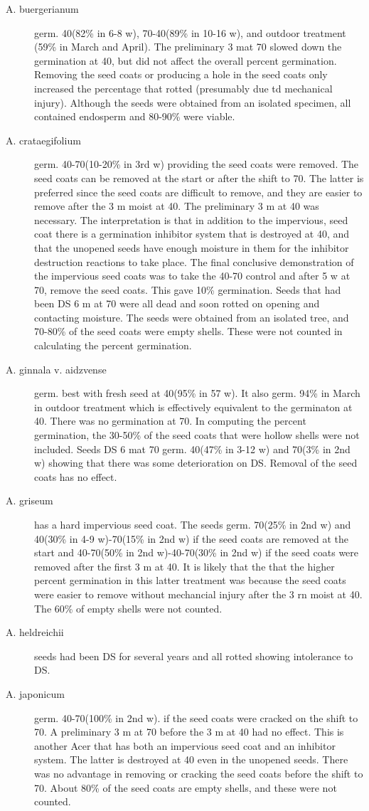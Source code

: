 \begin{description}
\item[A. buergerianum] germ. 40(82\% in 6-8 w), 70-40(89\% in 10-16 w), and outdoor
treatment (59\% in March and April). The preliminary 3 mat 70 slowed down the
germination at 40, but did not affect the overall percent germination. Removing the
seed coats or producing a hole in the seed coats only increased the percentage that
rotted (presumably due td mechanical injury). Although the seeds were obtained from
an isolated specimen, all contained endosperm and 80-90\% were viable.
\item[A. crataegifolium] germ. 40-70(10-20\% in 3rd w) providing the seed coats were
removed. The seed coats can be removed at the start or after the shift to 70. The latter
is preferred since the seed coats are difficult to remove, and they are easier to remove
after the 3 m moist at 40. The preliminary 3 m at 40 was necessary. The interpretation
is that in addition to the impervious, seed coat there is a germination inhibitor system
that is destroyed at 40, and that the unopened seeds have enough moisture in them
for the inhibitor destruction reactions to take place. The final conclusive demonstration
of the impervious seed coats was to take the 40-70 control and after 5 w at 70, remove
the seed coats. This gave 10\% germination. Seeds that had been DS 6 m at 70 were
all dead and soon rotted on opening and contacting moisture. The seeds were
obtained from an isolated tree, and 70-80\% of the seed coats were empty shells.
These were not counted in calculating the percent germination.

\item[A. ginnala v. aidzvense] germ. best with fresh seed at 40(95\% in 57 w). It also
germ. 94\% in March in outdoor treatment which is effectively equivalent to the
germinaton at 40. There was no germination at 70. In computing the percent
germination, the 30-50\% of the seed coats that were hollow shells were not included.
Seeds DS 6 mat 70 germ. 40(47\% in 3-12 w) and 70(3\% in 2nd w) showing that there
was some deterioration on DS. Removal of the seed coats has no effect.
\item[A. griseum] has a hard impervious seed coat. The seeds germ. 70(25\% in 2nd
w) and 40(30\% in 4-9 w)-70(15\% in 2nd w) if the seed coats are removed at the start
and 40-70(50\% in 2nd w)-40-70(30\% in 2nd w) if the seed coats were removed after
the first 3 m at 40. It is likely that the that the higher percent germination in this latter
treatment was because the seed coats were easier to remove without mechancial
injury after the 3 rn moist at 40. The 60\% of empty shells were not counted.
\item[A. heldreichii] seeds had been DS for several years and all rotted showing
intolerance to DS.
\item[A. japonicum] germ. 40-70(100\% in 2nd w). if the seed coats were cracked on
the shift to 70. A preliminary 3 m at 70 before the 3 m at 40 had no effect. This is
another Acer that has both an impervious seed coat and an inhibitor system. The latter
is destroyed at 40 even in the unopened seeds. There was no advantage in removing
or cracking the seed coats before the shift to 70. About 80\% of the seed coats are
empty shells, and these were not counted.


\end{description}
